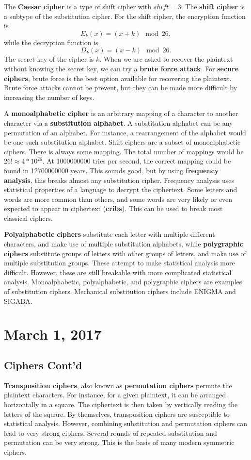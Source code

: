 \documentclass[11pt]{article}
\theoremstyle{plain} %
\theoremstyle{definition}
\theoremstyle{example}
\theoremstyle{remark}
\begin{document}
The \textbf{Caesar cipher} is a type of shift cipher with $shift = 3$. The \textbf{shift cipher} is a subtype of the substitution cipher. For the shift cipher, the encryption function is 
$$E_k(x) = (x+k)\mod 26,$$
while the decryption function is 
$$D_k(x) = (x-k)\mod26.$$
The secret key of the cipher is $k$. When we are asked to recover the plaintext without knowing the secret key, we can try a \textbf{brute force attack}. For \textbf{secure ciphers}, brute force is the best option available for recovering the plaintext. Brute force attacks cannot be prevent, but they can be made more difficult by increasing the number of keys. 

A \textbf{monoalphabetic cipher} is an arbitrary mapping of a character to another character via a \textbf{substitution alphabet}. A substitution alphabet can be any permutation of an alphabet. For instance, a rearrangement of the alphabet would be one such substitution alphabet. Shift ciphers are a subset of monoalphabetic ciphers. There is always some mapping. The total number of mappings would be $26! \approx 4*10^{26}$. At 1000000000 tries per second, the correct mapping could be found in 12700000000 years. This sounds good, but by using \textbf{frequency analysis}, this breaks almost any substitution cipher. Frequency analysis uses statistical properties of a language to decrypt the ciphertext. Some letters and words are more common than others, and some words are very likely or even expected to appear in ciphertext (\textbf{cribs}). This can be used to break most classical ciphers. 

\textbf{Polyalphabetic ciphers} substitute each letter with multiple different characters, and make use of multiple substitution alphabets, while \textbf{polygraphic ciphers} substitute groups of letters with other groups of letters, and make use of multiple substitution groups. These attempt to make statistical analysis more difficult. However, these are still breakable with more complicated statistical analysis. Monoalphabetic, polyalphabetic, and polygraphic ciphers are examples of substitution ciphers. Mechanical substitution ciphers include ENIGMA and SIGABA. 


\section{March 1, 2017}
\subsection{Ciphers Cont'd}
\textbf{Transposition ciphers}, also known as \textbf{permutation ciphers} permute the plaintext characters. For instance, for a given plaintext, it can be arranged horizontally in a square. The ciphertext is then taken by vertically reading the letters of the square. By themselves, transposition ciphers are susceptible to statistical analysis. However, combining substitution and permutation ciphers can lead to very strong ciphers. Several rounds of repeated substitution and permutation can be very strong. This is the basis of many modern symmetric ciphers. 
\end{document}
